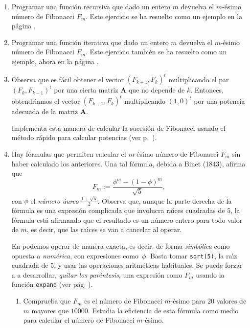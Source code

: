 \pagebreak[3]

\begin{ejer}
 \begin{enumerate}
  \item Programar una funci\'on recursiva que dado un entero $m$ devuelva el
$m$-\'esimo n\'umero de Fibonacci $F_m$.  Este ejercicio se ha resuelto como un
ejemplo en la p\'agina \pageref{fibor}.
  \item Programar una funci\'on iterativa  que dado un entero $m$ devuelva
el $m$-\'esimo n\'umero de Fibonacci $F_m$. Este ejercicio tambi\'en se ha
resuelto como un
ejemplo, ahora  en la p\'agina \pageref{fiboi}.
  \item \label{fib-matriz}Observa que es f\'acil obtener el vector
$(F_{k+1},F_k)^t$
multiplicando el par $(F_{k},F_{k-1})^t$ por una cierta matriz $\mathbf{A}$ que
no depende de $k$. Entonces, obtendr\'{\i}amos el vector $(F_{k+1},F_k)^t$
multiplicando $(1,0)^t$ por una potencia adecuada de la matriz $\mathbf{A}$.

Implementa esta manera de calcular la sucesi\'on de Fibonacci usando el
m\'etodo r\'apido para calcular potencias (ver p.~\pageref{potencias}). 
 
 \item Hay f\'ormulas que permiten calcular el $m$-\'esimo número de Fibonacci
$F_m$ sin haber calculado los anteriores. Una tal f\'ormula, debida a Binet
(1843),  
afirma que
\[F_m:=\frac{\phi^m-(1-\phi)^m}{\sqrt{5}},\]
con $\phi$ el {\itshape n\'umero áureo} $\frac{1+\sqrt{5}}{2}$. Observa que,
aunque la parte derecha de la f\'ormula es una expresi\'on complicada que
involucra ra\'{\i}ces cuadradas de $5$, la f\'ormula est\'a afirmando que el
resultado es un n\'umero entero para todo valor de $m$, es decir, que las
ra\'{\i}ces se van a cancelar al operar.

    En {\sage}  podemos operar de manera exacta, es decir, de forma {\itshape
simb\'olica} como opuesta a {\itshape numérica},  con expresiones como~$\phi$.
Basta tomar  \lstinline|sqrt(5)|, la ra\'{\i}z cuadrada de $5$, y usar las
operaciones aritm\'eticas habituales. Se puede forzar a {\sage} a desarrollar,
{\itshape quitar los par\'entesis},   una expresión como $F_m$ usando la función
\lstinline|expand| (ver p\'ag. \pageref{expand}). 

\begin{enumerate}
\renewcommand{\theenumi}{}%
\item\label{met-fibo-a} Comprueba que $F_m$ es el n\'umero de Fibonacci
$m$-\'esimo para $20$ valores de $m$ mayores que $10000$. Estudia la eficiencia
de esta f\'ormula como medio para calcular el n\'umero de Fibonacci $m$-\'esimo.


\end{enumerate}
\end{enumerate}
\end{ejer}
